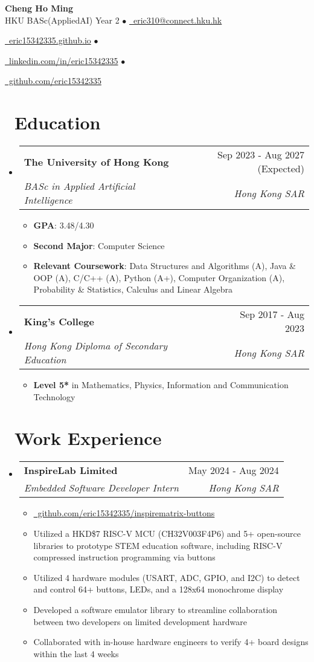 \documentclass[letterpaper,11pt]{article}
\makeatletter
\newcommand{\iconlink}[3]{
  \href{#2}{#1~#3}
}
\newcommand{\iconsection}[2]{
  \section[#2]{#1~#2}
}
\newcommand{\resumeItem}[1]{
  \item\small{
    {#1 \vspace{-2pt}}
  }
}
\newcommand{\resumeSubheading}[4]{
  \vspace{-2pt}\item
    \begin{tabular*}{0.98\textwidth}[t]{l@{\extracolsep{\fill}}r}
      \textbf{#1} & #2 \\
      \textit{\small#3} & \textit{\small #4} \\
    \end{tabular*}\vspace{-7pt}
}
\newcommand{\resumeSubHeadingListStart}{\begin{itemize}[leftmargin=0.15in, label={}]}
\newcommand{\resumeSubHeadingListEnd}{\end{itemize}}
\newcommand{\resumeItemListStart}{\begin{itemize}}
\newcommand{\resumeItemListEnd}{\end{itemize}\vspace{-5pt}}
\makeatother
\begin{document}
\begin{center}
    \textbf{\Huge Cheng Ho Ming} \\ \vspace{1pt}
    \small
    HKU BASc(AppliedAI) Year 2 $\bullet$ \iconlink{\faEnvelope}{mailto:eric310@connect.hku.hk}{eric310@connect.hku.hk} \\ \vspace{1pt}
    \iconlink{\faGlobe}{https://eric15342335.github.io/}{eric15342335.github.io} $\bullet$ 
    \iconlink{\faLinkedin}{https://linkedin.com/in/eric15342335}{linkedin.com/in/eric15342335} $\bullet$
    \iconlink{\faGithub}{https://github.com/eric15342335}{github.com/eric15342335}
\end{center}

\iconsection{\faGraduationCap}{Education}
  \resumeSubHeadingListStart
    \resumeSubheading
      {The University of Hong Kong}{Sep 2023 - Aug 2027 (Expected)}
      {BASc in Applied Artificial Intelligence}{Hong Kong SAR}
      \resumeItemListStart
        \resumeItem{\textbf{GPA}: 3.48/4.30}
        \resumeItem{\textbf{Second Major}: Computer Science}
        \resumeItem{\textbf{Relevant Coursework}: Data Structures and Algorithms (A), Java \& OOP (A), C/C++ (A), Python (A+), Computer Organization (A), Probability \& Statistics, Calculus and Linear Algebra}
      \resumeItemListEnd
    \resumeSubheading
      {King's College}{Sep 2017 - Aug 2023}
      {Hong Kong Diploma of Secondary Education}{Hong Kong SAR}
      \resumeItemListStart
        \resumeItem{\textbf{Level 5*} in Mathematics, Physics, Information and Communication Technology}
      \resumeItemListEnd
  \resumeSubHeadingListEnd

\iconsection{\faBriefcase}{Work Experience}
  \resumeSubHeadingListStart
    \resumeSubheading
      {InspireLab Limited}{May 2024 - Aug 2024}
      {Embedded Software Developer Intern}{Hong Kong SAR}
      \resumeItemListStart
        \resumeItem{\iconlink{\faGithub}{https://github.com/eric15342335/inspirematrix-buttons}{github.com/eric15342335/inspirematrix-buttons}}
        \resumeItem{Utilized a HKD\$7 RISC-V MCU (CH32V003F4P6) and 5+ open-source libraries to prototype STEM education software, including RISC-V compressed instruction programming via buttons}
        \resumeItem{Utilized 4 hardware modules (USART, ADC, GPIO, and I2C) to detect and control 64+ buttons, LEDs, and a 128x64 monochrome display}
        \resumeItem{Developed a software emulator library to streamline collaboration between two developers on limited development hardware}
        \resumeItem{Collaborated with in-house hardware engineers to verify 4+ board designs within the last 4 weeks}
      \resumeItemListEnd
  \resumeSubHeadingListEnd
\end{document}
